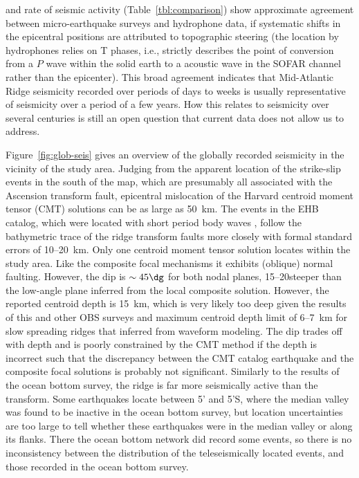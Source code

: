 \documentclass[jgr]{aguplus}
\newlength{\tw}
\begin{document}
\begin{article}
\citep[Fig.~13 of ][]{smith03} and rate of seismic
activity (Table~\ref{tbl:comparison}) show approximate agreement between
micro-earthquake surveys and hydrophone data, if systematic shifts in
the epicentral positions are attributed to topographic steering (the
location by hydrophones relies on T phases, i.e., strictly describes the
point of conversion from a $P$ wave within the solid earth to a
acoustic wave in the SOFAR channel rather than the epicenter).  This broad agreement indicates that
Mid-Atlantic Ridge seismicity recorded over periods of days to weeks is
usually representative of seismicity over a period of a few years.
How this relates to seismicity over several centuries is still
an open question that current data does not allow us to address.

Figure~\ref{fig:glob-seis} gives an overview of the globally recorded
seismicity in the vicinity of the study area. Judging from the
apparent location of the strike-slip events in the south of the map,
which are presumably all associated with the Ascension transform
fault, epicentral mislocation of the Harvard centroid moment tensor (CMT) solutions
\citep{dziewonski81a} can be as large as 50~km. The events
in the EHB catalog, which were located with short period body waves
\citep{engdahl98}, follow the bathymetric trace of the ridge  transform
faults more closely with formal standard errors of 10--20~km.  Only
one centroid moment tensor solution locates within the study
area. Like the composite focal mechanisms it exhibits (oblique) normal
faulting. However, the dip is $\sim 45\dg$ for both nodal planes,
15--20\dg steeper than the low-angle plane inferred from the local
composite solution. However, the reported centroid depth is 15~km,
which is very likely too deep given the results of this and other OBS
surveys and  maximum centroid depth limit
of 6--7~km for slow spreading ridges that \citet{huang88} inferred  from waveform modeling.
The dip trades off with depth and is poorly constrained by the CMT
method if the depth is incorrect
\citep{dziewonski81a} such that
the discrepancy between the CMT catalog earthquake and the composite focal
solutions is probably not significant. Similarly to the results of the
ocean bottom survey, the ridge is far more seismically active than the
transform.  Some earthquakes locate between 5' and 5'S,
where the median valley  was found to be inactive in the ocean bottom
survey, but location uncertainties are too large to tell whether these
earthquakes were in the median valley or along its flanks. There the
ocean bottom network did record some events, so there is no
inconsistency between the distribution of the teleseismically located
events, and those recorded in the ocean bottom
survey.


\end{article}
\end{document}
